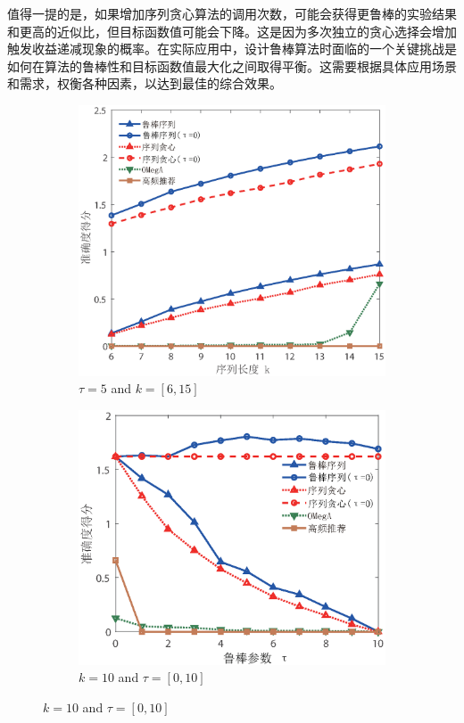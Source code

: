 值得一提的是，如果增加序列贪心算法的调用次数，可能会获得更鲁棒的实验结果和更高的近似比，但目标函数值可能会下降。这是因为多次独立的贪心选择会增加触发收益递减现象的概率。在实际应用中，设计鲁棒算法时面临的一个关键挑战是如何在算法的鲁棒性和目标函数值最大化之间取得平衡。这需要根据具体应用场景和需求，权衡各种因素，以达到最佳的综合效果。

\begin{figure}[H]
    \centering
    \begin{subfigure}{0.45\textwidth}
        \includegraphics[width=\linewidth]{figure/rosenets/wik/wik-acc}
        \caption{$\tau=5$ and $k=[6,15]$}
        \label{fig:wik-acc}
    \end{subfigure}
    \hfill
    \begin{subfigure}{0.45\textwidth}
        \includegraphics[width=\linewidth]{figure/rosenets/wik/wik-acc-t}
        \caption{$k=10$ and $\tau=[0,10]$}
        \label{fig:wik-acc-t}
    \end{subfigure}


\end{figure}
